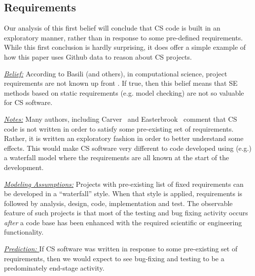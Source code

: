 \documentclass[sigconf,review,anonymous]{acmart}
\begin{document}
\subsection{Requirements}\label{rments}


Our analysis of this first belief will conclude that
CS code is built in an exploratory manner,
rather than in response to some pre-defined
requirements. While this first conclusion is hardly
surprising, it does offer a simple example
of how this paper uses Github
data to reason about CS projects.



\noindent \textit{\underline{Belief:}} According to Basili (and others), in computational science,
project requirements are not known up front \cite{segal08_ss, carver07_environment, segal05_ss, basili08_hpc, easterbrook_cs}.
If true, then this belief means that SE methods based on 
static requirements (e.g. model checking) are not so valuable
for CS software.





\noindent \textit{\underline{Notes:}} 
Many authors, including Carver~\cite{carver07_environment}
and Easterbrook~\cite{easterbrook_cs}
comment that CS code is not written in order
to satisfy some pre-existing set of requirements.
Rather, it is written an exploratory fashion in order
to better understand some effects. 
This would make CS software very different to code developed using (e.g.) a waterfall model where the requirements
are all known at the start of the development.






\noindent \textit{\underline{Modeling Assumptions:}} 
Projects with pre-existing list of fixed requirements 
can be developed in a ``waterfall'' style.
When that style is applied,
requirements is followed by analysis,
design, code, implementation and test.
The observable feature of such projects
is that most of the testing and bug fixing
activity occurs {\em after} a code base
has been enhanced with the required
scientific or engineering functionality.





\noindent \textit{\underline{Prediction: }} If CS software was written in response to some pre-existing set of requirements, then
we would expect to see bug-fixing and testing to be a predominately end-stage activity.
\end{document}
